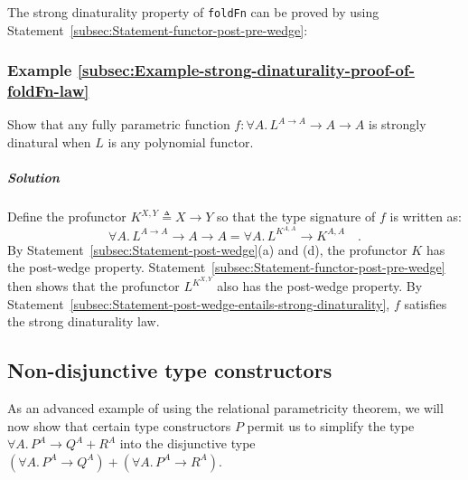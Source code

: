 The strong dinaturality property of \lstinline!foldFn! can be proved
by using Statement~\ref{subsec:Statement-functor-post-pre-wedge}:

\subsubsection{Example \label{subsec:Example-strong-dinaturality-proof-of-foldFn-law}\ref{subsec:Example-strong-dinaturality-proof-of-foldFn-law}}

Show that any fully parametric function $f:\forall A.\,L^{A\rightarrow A}\rightarrow A\rightarrow A$
is strongly dinatural when $L$ is any polynomial functor.

\subparagraph{Solution}

Define the profunctor $K^{X,Y}\triangleq X\rightarrow Y$ so that
the type signature of $f$ is written as:
\[
\forall A.\,L^{A\rightarrow A}\rightarrow A\rightarrow A=\forall A.\,L^{K^{A,A}}\rightarrow K^{A,A}\quad.
\]
By Statement~\ref{subsec:Statement-post-wedge}(a) and (d), the profunctor
$K$ has the post-wedge property. Statement~\ref{subsec:Statement-functor-post-pre-wedge}
then shows that the profunctor $L^{K^{X,Y}}$ also has the post-wedge
property. By Statement~\ref{subsec:Statement-post-wedge-entails-strong-dinaturality},
$f$ satisfies the strong dinaturality law. 

\subsection{Non-disjunctive type constructors}

As an advanced example of using the relational parametricity theorem,
we will now show that certain type constructors $P$ permit us to
simplify the type $\forall A.\,P^{A}\rightarrow Q^{A}+R^{A}$ into
the disjunctive type $(\forall A.\,P^{A}\rightarrow Q^{A})+(\forall A.\,P^{A}\rightarrow R^{A})$.

